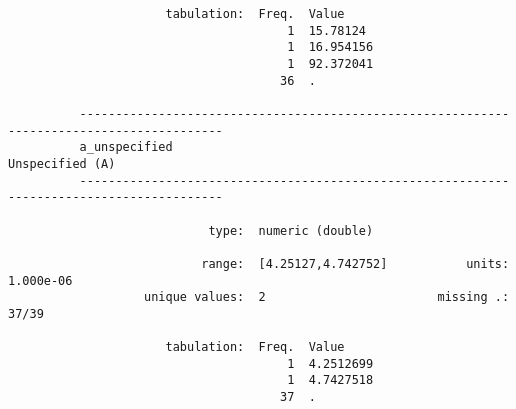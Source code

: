 \documentclass{article}
\begin{document}
\begin{verbatim}
                      tabulation:  Freq.  Value
                                       1  15.78124
                                       1  16.954156
                                       1  92.372041
                                      36  .
          
          ------------------------------------------------------------------------------------------
          a_unspecified                                                              Unspecified (A)
          ------------------------------------------------------------------------------------------
          
                            type:  numeric (double)
          
                           range:  [4.25127,4.742752]           units:  1.000e-06
                   unique values:  2                        missing .:  37/39
          
                      tabulation:  Freq.  Value
                                       1  4.2512699
                                       1  4.7427518
                                      37  .
          
          
          
          
          
          
\end{verbatim}
\end{document}

